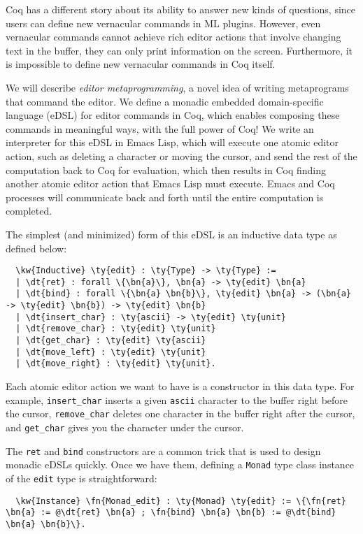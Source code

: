 \documentclass[acmlarge]{acmart}
\newcommand\fakeslant[1]{%
  \special{pdf: literal 1 0 0.167 1 0 0 cm}#1\special{pdf: literal 1 0 -0.167 1 0 0 cm}}
\newcommand{\IdrisData}[1]{\textcolor{IdrisRed}{#1}}
\newcommand{\IdrisType}[1]{\textcolor{IdrisBlue}{#1}}
\newcommand{\IdrisBound}[1]{\textcolor{IdrisLilac}{\fakeslant{#1}}}
\newcommand{\IdrisFunction}[1]{\textcolor{IdrisGreen}{#1}}
\newcommand{\IdrisKeyword}[1]{{\textbf{#1}}}
\newcommand{\ty}[1]{\IdrisType{\texttt{#1}}}
\newcommand{\kw}[1]{\IdrisKeyword{\texttt{#1}}}
\newcommand{\fn}[1]{\IdrisFunction{\texttt{#1}}}
\newcommand{\dt}[1]{\IdrisData{\texttt{#1}}}
\newcommand{\bn}[1]{\IdrisBound{\texttt{#1}}}
\begin{document}
  Coq has a different story about its ability to answer new kinds of questions,
  since users can define new vernacular commands in ML plugins.
  However, even vernacular commands cannot achieve rich editor actions that
  involve changing text in the buffer,
  they can only print information on the screen.
  Furthermore, it is impossible to define new vernacular commands in
  Coq itself.

  We will describe \emph{editor metaprogramming}, a
  novel idea of writing metaprograms that command the editor.
  We define a monadic embedded domain-specific language (eDSL) for editor
  commands in Coq, which enables composing these commands in meaningful ways,
  with the full power of Coq!
  We write an interpreter for this eDSL in Emacs Lisp, which will execute one
  atomic editor action, such as deleting a character or moving the cursor,  and
  send the rest of the computation back to Coq for evaluation, which then
  results in Coq finding another atomic editor action that Emacs Lisp must
  execute. Emacs and Coq processes will communicate back and forth until the
  entire computation is completed.

  The simplest (and minimized) form of this eDSL is an inductive data type as defined below:

\begin{Verbatim}
  \kw{Inductive} \ty{edit} : \ty{Type} -> \ty{Type} :=
  | \dt{ret} : forall \{\bn{a}\}, \bn{a} -> \ty{edit} \bn{a}
  | \dt{bind} : forall \{\bn{a} \bn{b}\}, \ty{edit} \bn{a} -> (\bn{a} -> \ty{edit} \bn{b}) -> \ty{edit} \bn{b}
  | \dt{insert_char} : \ty{ascii} -> \ty{edit} \ty{unit}
  | \dt{remove_char} : \ty{edit} \ty{unit}
  | \dt{get_char} : \ty{edit} \ty{ascii}
  | \dt{move_left} : \ty{edit} \ty{unit}
  | \dt{move_right} : \ty{edit} \ty{unit}.
\end{Verbatim}

Each atomic editor action we want to have is a constructor in this data type. For example, \dt{insert\_char} inserts a given \ty{ascii} character to the buffer right before the cursor, \dt{remove\_char} deletes one character in the buffer right after the cursor, and \dt{get\_char} gives you the character under the cursor.

The \dt{ret} and \dt{bind} constructors are a common trick that is used to design monadic eDSLs quickly. Once we have them, defining a \ty{Monad} type class instance of the \ty{edit} type is straightforward:

\begin{Verbatim}
  \kw{Instance} \fn{Monad_edit} : \ty{Monad} \ty{edit} := \{\fn{ret} \bn{a} := @\dt{ret} \bn{a} ; \fn{bind} \bn{a} \bn{b} := @\dt{bind} \bn{a} \bn{b}\}.
\end{Verbatim}
\end{document}
